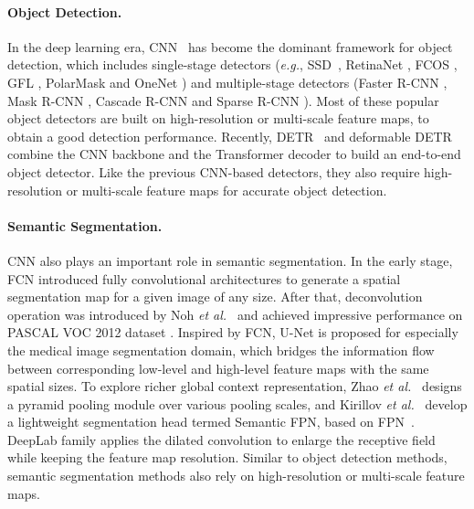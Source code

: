 \documentclass[10pt,twocolumn,letterpaper]{article}
\def\eg{\emph{e.g.}}
\def\etal{{\em et al.~}}
\begin{document}
\paragraph{Object Detection.} In the deep learning era, CNN~\cite{lecun1998gradient} has become the dominant framework for object detection, which includes single-stage detectors (\eg, SSD~\cite{liu2016ssd}, RetinaNet \cite{lin2017focal}, FCOS \cite{tian2019fcos}, GFL \cite{li2020generalized}, PolarMask \cite{xie2020polarmask} and OneNet \cite{sun2020onenet}) and multiple-stage detectors (Faster R-CNN \cite{ren2015faster}, Mask R-CNN \cite{he2017mask}, Cascade R-CNN \cite{cai2018cascade} and Sparse R-CNN \cite{sun2020sparse}).
Most of these popular object detectors are built on high-resolution or multi-scale feature maps, to obtain a good detection performance.
Recently, DETR~\cite{carion2020end} and deformable DETR~\cite{zhu2020deformable} combine the CNN backbone and the Transformer decoder to build an end-to-end object detector.
Like the previous CNN-based detectors, they also require high-resolution or multi-scale feature maps for accurate object detection.

\paragraph{Semantic Segmentation.} CNN also plays an important role in semantic segmentation.
In the early stage, FCN \cite{long2015fully} introduced fully convolutional architectures to generate a spatial segmentation map for a given image of any size.
After that, deconvolution operation was introduced by Noh \etal\cite{noh2015learning} and achieved impressive performance on PASCAL VOC 2012 dataset \cite{shetty2016application}.
Inspired by FCN, U-Net \cite{ronneberger2015u} is proposed for especially the medical image segmentation domain, which bridges the information flow between corresponding low-level and high-level feature maps with the same spatial sizes. 
To explore richer global context representation, Zhao \etal\cite{zhao2017pyramid} designs a pyramid pooling module over various pooling scales, and Kirillov \etal\cite{kirillov2019panoptic} develop a lightweight segmentation head termed Semantic FPN, based on FPN~\cite{lin2017feature}.
DeepLab family \cite{chen2017deeplab,liu2019auto} applies the dilated convolution to enlarge the receptive field while keeping the feature map resolution.
Similar to object detection methods, semantic segmentation methods also rely on high-resolution or multi-scale feature maps.
\end{document}
